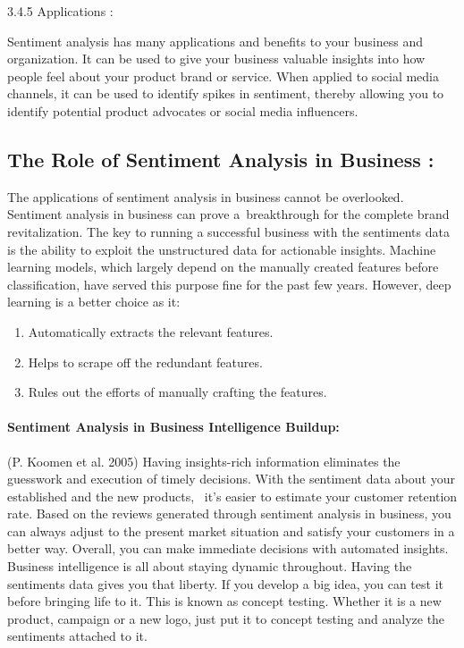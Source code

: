 \documentclass{article} %
\begin{document}
       3.4.5 Applications : 

Sentiment analysis has many applications and benefits to your business and organization. It can be used to give your business valuable insights into how people feel about your product brand or service. When applied to social media channels, it can be used to identify spikes in sentiment, thereby allowing you to identify potential product advocates or social media influencers.


\subsection{The Role of Sentiment Analysis in Business :}

The applications of sentiment analysis in business cannot be overlooked. Sentiment analysis in business can prove a~breakthrough for the complete brand revitalization. The key to running a successful business with the sentiments data is the ability to exploit the unstructured data for actionable insights. Machine learning models, which largely depend on the manually created features before classification, have served this purpose fine for the past few years. However, deep learning is a better choice as it:

\begin{enumerate}
\item  Automatically extracts the relevant features.

\item  Helps to scrape off the redundant features.

\item  Rules out the efforts of manually crafting the features.
\end{enumerate}


\paragraph{Sentiment Analysis in Business Intelligence Buildup:}

\noindent             (P. Koomen et al.\textbf{ }2005) Having insights-rich information eliminates the guesswork and execution of timely decisions. With the sentiment data about your established and the new products, ~it's easier to estimate your customer retention rate. Based on the reviews generated through sentiment analysis in business, you can always adjust to the present market situation and satisfy your customers in a better way. Overall, you can make immediate decisions with automated insights. Business intelligence is all about staying dynamic throughout. Having the sentiments data gives you that liberty. If you develop a big idea, you can test it before bringing life to it. This is known as concept testing. Whether it is a new product, campaign or a new logo, just put it to concept testing and analyze the sentiments attached to it.
\end{document}
